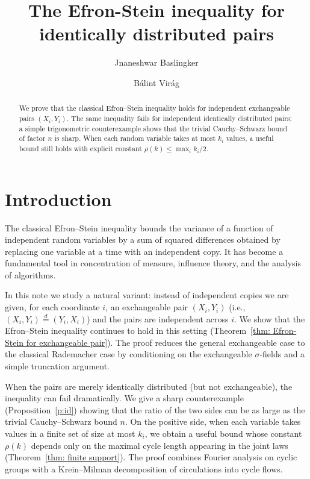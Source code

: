 \documentclass[letterpaper, 12pt]{article}
\title{The Efron-Stein inequality for identically distributed pairs}
\author{Jnaneshwar Baslingker \and B\'alint Vir\'ag}
\theoremstyle{plain}
\theoremstyle{definition}
\theoremstyle{remark}
\begin{document}
\maketitle
\begin{abstract}
We prove that the classical Efron--Stein inequality holds for independent exchangeable pairs \((X_i,Y_i)\). The same inequality fails for independent identically distributed pairs; a simple trigonometric counterexample shows that the trivial Cauchy--Schwarz bound of factor \(n\) is sharp. When each random variable takes at most \(k_i\) values, a useful bound still holds with explicit constant \(\rho(k)\le\max_i k_i/2\).
\end{abstract}

\section{Introduction}

The classical Efron--Stein inequality \cite{efron1981jackknife,steele1986efron} bounds the variance of a function of independent random variables by a sum of squared differences obtained by replacing one variable at a time with an independent copy. It has become a fundamental tool in concentration of measure, influence theory, and the analysis of algorithms.

In this note we study a natural variant: instead of independent copies we are given, for each coordinate \(i\), an exchangeable pair \((X_i,Y_i)\) (i.e., \((X_i,Y_i)\stackrel{d}{=}(Y_i,X_i)\)) and the pairs are independent across \(i\). We show that the Efron--Stein inequality continues to hold in this setting (Theorem~\ref{thm: Efron-Stein for exchangeable pair}). The proof reduces the general exchangeable case to the classical Rademacher case by conditioning on the exchangeable \(\sigma\)-fields and a simple truncation argument.

When the pairs are merely identically distributed (but not exchangeable), the inequality can fail dramatically. We give a sharp counterexample (Proposition~\ref{p:id}) showing that the ratio of the two sides can be as large as the trivial Cauchy--Schwarz bound \(n\). On the positive side, when each variable takes values in a finite set of size at most \(k_i\), we obtain a useful bound whose constant \(\rho(k)\) depends only on the maximal cycle length appearing in the joint laws (Theorem~\ref{thm: finite support}). The proof combines Fourier analysis on cyclic groups with a Krein--Milman decomposition of circulations into cycle flows.
\end{document}
